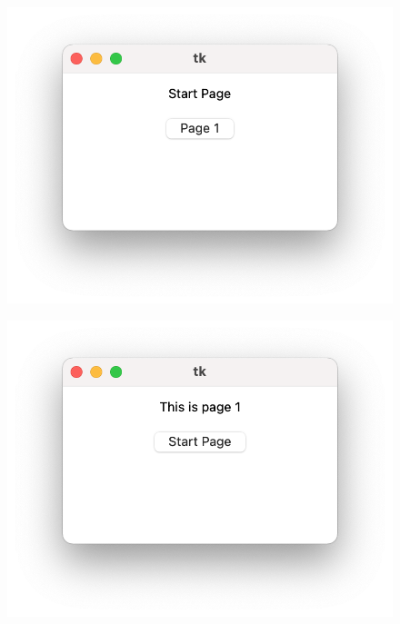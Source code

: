 \documentclass[11pt, a4paper]{article}
\begin{document}
\begin{figure}
    \centering
    \begin{minipage}{.5\textwidth}
      \centering
      \includegraphics[width=\linewidth]{p_tk_start.png}
      \label{fig:test1}
    \end{minipage}%
    \begin{minipage}{.5\textwidth}
      \centering
      \includegraphics[width=\linewidth]{p_tk_p1.png}
      \label{fig:test2}
    \end{minipage}
\end{figure}
\end{document}
